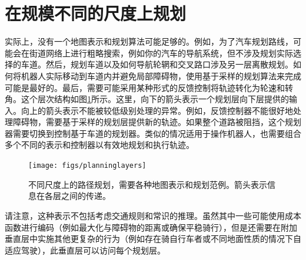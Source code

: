\section{在规模不同的尺度上规划}
实际上，没有一个地图表示和规划算法可能足够的。例如，为了汽车规划路线，可能会在街道网络上进行粗略搜索，例如你的汽车的导航系统，但不涉及规划实际选择的车道。然后，规划车道以及如何导航轮辋和交叉路口涉及另一层离散规划。如何将机器人实际移动到车道内并避免局部障碍物，使用基于采样的规划算法来完成可能是最好的。最后，需要可能采用某种形式的反馈控制将轨迹转化为轮速和转角。这个层次结构如图\ref{fig:planninglayers}所示。这里，向下的箭头表示一个规划层向下层提供的输入。向上的箭头表示不能被较低级别处理的异常。例如，反馈控制器不能很好地处理障碍物，需要基于采样的规划层提供新的轨迹。如果整个道路被阻挡，这个规划器需要切换到控制基于车道的规划器。类似的情况适用于操作机器人，也需要组合多个不同的表示和控制器以有效地规划和执行轨迹。

\begin{figure}
\centering
\texttt{[image: figs/planninglayers]}
\caption{不同尺度上的路径规划，需要各种地图表示和规划范例。箭头表示信息在各层之间的传递。
\label{fig:planninglayers}}
\end{figure}


请注意，这种表示不包括考虑交通规则和常识的推理。虽然其中一些可能使用成本函数进行编码（例如最大化与障碍物的距离或确保平稳骑行），但是还需要在附加垂直层中实施其他更复杂的行为（例如存在骑自行车者或不同地面性质的情况下自适应驾驶），此垂直层可以访问每个规划层。


